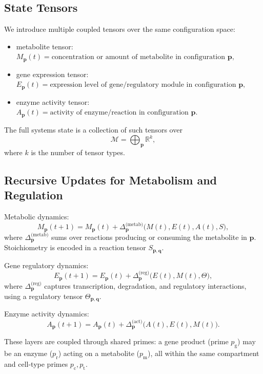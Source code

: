 \documentclass[11pt]{article}
\begin{document}
\subsection{State Tensors}
We introduce multiple coupled tensors over the same configuration space:
\begin{itemize}
    \item metabolite tensor:
    \(
    M_{\mathbf{p}}(t)
    =
    \text{concentration or amount of metabolite in configuration }
    \mathbf{p},
    \)
    \item gene expression tensor:
    \(
    E_{\mathbf{p}}(t)
    =
    \text{expression level of gene/regulatory module in configuration }
    \mathbf{p},
    \)
    \item enzyme activity tensor:
    \(
    A_{\mathbf{p}}(t)
    =
    \text{activity of enzyme/reaction in configuration }
    \mathbf{p}.
    \)
\end{itemize}
The full systems state is a collection of such tensors over
\[
\mathcal{M}
=
\bigoplus_{\mathbf{p}} \mathbb{R}^k,
\]
where $k$ is the number of tensor types.

\subsection{Recursive Updates for Metabolism and Regulation}
Metabolic dynamics:
\[
M_{\mathbf{p}}(t+1)
=
M_{\mathbf{p}}(t)
+
\Delta_{\mathbf{p}}^{\text{(metab)}}\big(M(t), E(t), A(t), S\big),
\]
where $\Delta_{\mathbf{p}}^{\text{(metab)}}$ sums over reactions producing or consuming the metabolite in $\mathbf{p}$. Stoichiometry is encoded in a reaction tensor $S_{\mathbf{p},\mathbf{q}}$.

Gene regulatory dynamics:
\[
E_{\mathbf{p}}(t+1)
=
E_{\mathbf{p}}(t)
+
\Delta_{\mathbf{p}}^{\text{(reg)}}\big(E(t), M(t), \Theta\big),
\]
where $\Delta_{\mathbf{p}}^{\text{(reg)}}$ captures transcription, degradation, and regulatory interactions, using a regulatory tensor $\Theta_{\mathbf{p},\mathbf{q}}$.

Enzyme activity dynamics:
\[
A_{\mathbf{p}}(t+1)
=
A_{\mathbf{p}}(t)
+
\Delta_{\mathbf{p}}^{\text{(act)}}\big(A(t), E(t), M(t)\big).
\]

These layers are coupled through shared primes: a gene product (prime $p_{\text{g}}$) may be an enzyme ($p_{\text{r}}$) acting on a metabolite ($p_{\text{m}}$), all within the same compartment and cell-type primes $p_{\text{c}}, p_{\text{t}}$.
\end{document}
